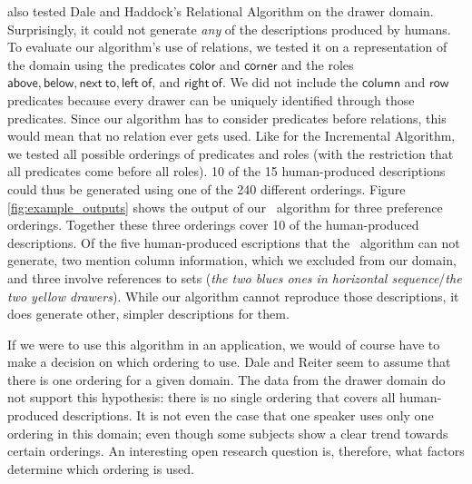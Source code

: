 



 also tested Dale and
Haddock's 
Relational Algorithm on the drawer domain. Surprisingly, it could not
generate \textit{any} of the descriptions produced by humans. To
evaluate our algorithm's use of relations, we tested it on a
representation of the domain using the predicates $\mathsf{color}$ and
$\mathsf{corner}$ and the roles $\mathsf{above, below, next\ to, left\ of}$,
and $\mathsf{right\ of}$. We did not include the $\mathsf{column}$ and
$\mathsf{row}$ predicates because every drawer can be uniquely
identified through those predicates. Since our algorithm has to
consider predicates before relations, this would mean that no relation
ever gets used. Like for the Incremental Algorithm, we tested all
possible orderings of predicates and roles (with the restriction that
all predicates come before all roles). 10 of the 15 human-produced
descriptions could thus be generated using one of the 240 different
orderings. Figure \ref{fig:example_outputs} shows the output of our
\el\ algorithm for three preference orderings. Together these three
orderings cover 10 of the human-produced descriptions. 
Of the five human-produced escriptions that the \el\
algorithm can not generate, two mention column information, which we
excluded from our domain, and three involve references to sets
(\textit{the two blues ones in horizontal sequence}/\textit{the two
yellow drawers}). While our algorithm cannot reproduce those
descriptions, it does  generate other, simpler descriptions for them.


If we were to use this algorithm in an application, we would of course
have to make a decision on which ordering to use. Dale and Reiter
\shortcite{Dale1995} seem to assume that there is one ordering for a
given domain. The data from the drawer domain do not support this
hypothesis: there is no single ordering that covers all human-produced
descriptions. It is not even the case that one speaker uses only one
ordering in this domain; even though some subjects show a clear trend
towards certain orderings. An interesting open research question is,
therefore, what factors determine which ordering is used. 



